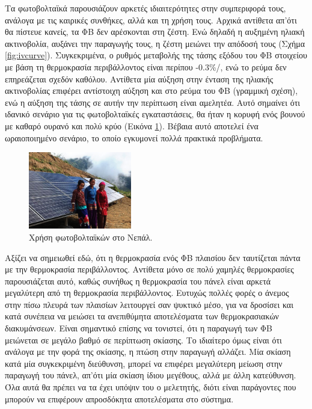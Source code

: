 \documentclass[12pt]{report}
\begin{document}
Τα φωτοβολταϊκά παρουσιάζουν αρκετές ιδιαιτερότητες στην συμπεριφορά τους, ανάλογα με τις καιρικές συνθήκες, αλλά και τη χρήση τους. Αρχικά αντίθετα απ'ότι θα πίστευε κανείς, τα ΦΒ δεν αρέσκονται στη ζέστη. Ενώ δηλαδή η αυξημένη 
ηλιακή ακτινοβολία, αυξάνει την παραγωγής τους, η ζέστη μειώνει την απόδοσή τους (Σχήμα \ref{fig:ivcurve}). Συγκεκριμένα, ο ρυθμός μεταβολής της τάσης εξόδου του ΦΒ στοιχείου με βάση τη θερμοκρασία περιβάλλοντος είναι περίπου 
-0.3\%/{}, ενώ το ρεύμα δεν επηρεάζεται σχεδόν καθόλου. Αντίθετα μία αύξηση στην ένταση της ηλιακής ακτινοβολίας επιφέρει αντίστοιχη αύξηση και στο ρεύμα του ΦΒ (γραμμική σχέση), ενώ η αύξηση της τάσης σε αυτήν την 
περίπτωση είναι αμελητέα. Αυτό σημαίνει ότι ιδανικό σενάριο για τις φωτοβολταϊκές εγκαταστάσεις, θα ήταν η κορυφή ενός βουνού με καθαρό ουρανό και πολύ κρύο (Εικόνα \ref{fig:nepal}). Βέβαια αυτό αποτελεί ένα ωραιοποιημένο σενάριο, 
το οποίο εγκυμονεί πολλά πρακτικά προβλήματα. 

\begin{figure}[h]
				\center
				\includegraphics[width=0.4\textwidth]{nepal}
				\captionsetup{name=Εικόνα}
				\caption{Χρήση φωτοβολταϊκών στο Νεπάλ.}
				\label{fig:nepal}
\end{figure}

Αξίζει να σημειωθεί εδώ, ότι η θερμοκρασία ενός ΦΒ πλαισίου δεν ταυτίζεται πάντα με την θερμοκρασία περιβάλλοντος. Αντίθετα μόνο σε πολύ χαμηλές θερμοκρασίες παρουσιάζεται αυτό, καθώς συνήθως η θερμοκρασία του πάνελ είναι αρκετά 
μεγαλύτερη από τη θερμοκρασία περιβάλλοντος. Ευτυχώς πολλές φορές ο άνεμος στην πίσω πλευρά των πλαισίων λειτουργεί σαν ψυκτικό μέσο, για να δροσίσει και κατά συνέπεια να μειώσει τα ανεπιθύμητα αποτελέσματα των θερμοκρασιακών 
διακυμάνσεων. Είναι σημαντικό επίσης να τονιστεί, ότι η παραγωγή των ΦΒ μειώνεται σε μεγάλο βαθμό σε περίπτωση σκίασης. Το ιδιαίτερο όμως είναι ότι ανάλογα με την φορά της σκίασης, η πτώση στην παραγωγή αλλάζει. Μία σκίαση κατά μία 
συγκεκριμένη διεύθυνση, μπορεί να επιφέρει μεγαλύτερη μείωση στην παραγωγή του πάνελ, απ'ότι μία σκίαση ίδιου μεγέθους, αλλά με άλλη κατεύθυνση. Όλα αυτά θα πρέπει να τα έχει υπόψιν του ο μελετητής, διότι είναι παράγοντες που μπορούν
να επιφέρουν απροσδόκητα αποτελέσματα στο σύστημα. 
\end{document}
